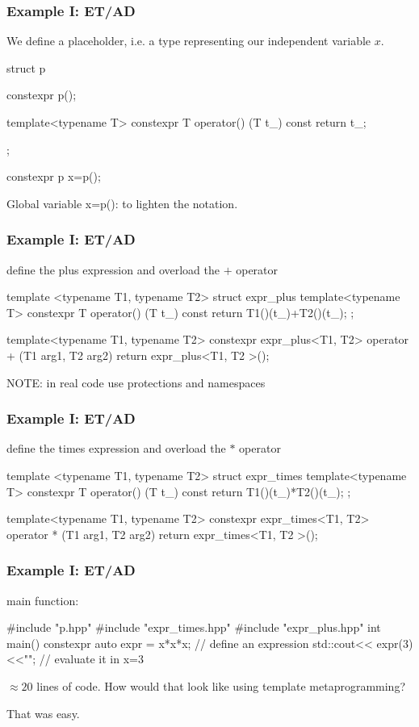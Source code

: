 \documentclass[aspectratio=43]{beamer}
\begin{document}
\begin{frame}[fragile]\frametitle{Example I: ET/AD}
  We define a placeholder, i.e. a type representing our independent variable $x$.
\begin{Cpplisting}{}
struct p{
  constexpr p(){};

  template<typename T>
  constexpr T operator() (T t_) const {
    return t_;
  }
};

constexpr p x=p();
\end{Cpplisting}
Global variable x=p(): to lighten the notation.
\end{frame}


\begin{frame}[fragile]\frametitle{Example I: ET/AD}
  define the plus expression and overload the $+$ operator
\begin{Cpplisting}{}
template <typename T1, typename T2>
struct expr_plus{
  template<typename T>
  constexpr T operator() (T t_) const{
    return T1()(t_)+T2()(t_);
  }
};

template<typename T1, typename T2>
constexpr expr_plus<T1, T2>
operator + (T1 arg1, T2 arg2){
  return expr_plus<T1, T2 >();}
\end{Cpplisting}
NOTE: in real code use protections and namespaces
\end{frame}

\begin{frame}[fragile]\frametitle{Example I: ET/AD}
  define the times expression and overload the $*$ operator
\begin{Cpplisting}{}
template <typename T1, typename T2>
struct expr_times{
  template<typename T>
  constexpr T operator() (T t_) const{
    return T1()(t_)*T2()(t_);
  }
};

template<typename T1, typename T2>
constexpr expr_times<T1, T2>
operator * (T1 arg1, T2 arg2){
  return expr_times<T1, T2 >();}
\end{Cpplisting}
\end{frame}

\begin{frame}[fragile]\frametitle{Example I: ET/AD}
  main function:
  \begin{Cpplisting}[: main]{}
#include "p.hpp"
#include "expr_times.hpp"
#include "expr_plus.hpp"
int main(){
  constexpr auto expr = x*x*x; // define an expression
  std::cout<< expr(3)<<"\n"; // evaluate it in x=3
}
  \end{Cpplisting}
  $\approx20$ lines of code. How would that look like using template metaprogramming?

  That was easy.
\end{frame}
\end{document}
